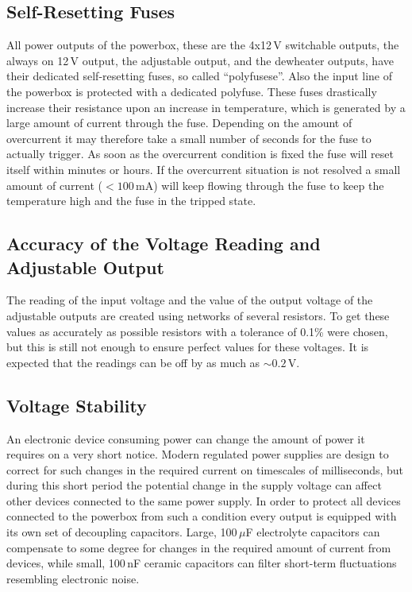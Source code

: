 \documentclass{scrartcl}
\begin{document}
\subsection{Self-Resetting Fuses}
All power outputs of the powerbox, these are the 4x12\,V switchable outputs, the
always on 12\,V output, the adjustable output, and the dewheater outputs, have
their dedicated self-resetting fuses, so called ``polyfusese''. Also the input
line of the powerbox is protected with a dedicated polyfuse. These fuses
drastically increase their resistance upon an increase in temperature, which is
generated by a large amount of current through the fuse. Depending on the amount
of overcurrent it may therefore take a small number of seconds for the fuse to
actually trigger. As soon as the overcurrent condition is fixed the fuse will
reset itself within minutes or hours. If the overcurrent situation is not
resolved a small amount of current ($< 100\,\mathrm{mA}$) will keep flowing
through the fuse to keep the temperature high and the fuse in the tripped state.

\subsection{Accuracy of the Voltage Reading and Adjustable Output}
The reading of the input voltage and the value of the output voltage of the
adjustable outputs are created using networks of several resistors. To get these
values as accurately as possible resistors with a tolerance of 0.1\% were
chosen, but this is still not enough to ensure perfect values for these
voltages. It is expected that the readings can be off by as much as $\sim
0.2\,\mathrm{V}$.

\subsection{Voltage Stability}
An electronic device consuming power can change the amount of power it requires
on a very short notice. Modern regulated power supplies are design to correct
for such changes in the required current on timescales of milliseconds, but
during this short period the potential change in the supply voltage can affect
other devices connected to the same power supply. In order to protect all
devices connected to the powerbox from such a condition every output is equipped
with its own set of decoupling capacitors. Large, 100\,$\mu$F electrolyte
capacitors can compensate to some degree for changes in the required amount of
current from devices, while small, 100\,nF ceramic capacitors can filter
short-term fluctuations resembling electronic noise.
\end{document}
